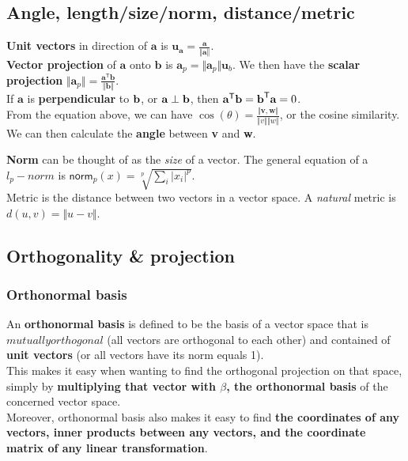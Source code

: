 \documentclass[12pt]{article}
\begin{document}
\subsection*{Angle, length/size/norm, distance/metric}
\textbf{Unit vectors} in direction of $\textbf{a}$ is $\textbf{u}_\textbf{a} = \frac{\textbf{a}}{\Vert \textbf{a}\Vert}$.\\
\textbf{Vector projection} of $\textbf{a}$ onto $\textbf{b}$ is $\textbf{a}_p=\Vert \textbf{a}_p\Vert \textbf{u}_b$. We then have the \textbf{scalar projection} $\Vert \textbf{a}_p\Vert= \frac{\textbf{a}^\textsf{T}\textbf{b}}{\Vert\textbf{b}\Vert}$.\\
If $\textbf{a}$ is \textbf{perpendicular} to $\textbf b$, or $\textbf a \perp\textbf  b$, then $\textbf a^\textsf{T}\textbf b=\textbf  b^\textsf{T}\textbf a = 0$.\\
From the equation above, we can have $\cos(\theta) = \frac{\Vert \textbf{v},\textbf{w} \Vert}{\Vert v \Vert \Vert w\Vert}$, or the cosine similarity. We can then calculate the \textbf{angle} between \textbf{v} and \textbf{w}.

\textbf{Norm} can be thought of as the \textit{size} of a vector. The general equation of a $l_p-norm$ is $\textsf{norm}_p(x) = \sqrt[p]{\sum_i|x_i|^p}$.\\
Metric is the distance between two vectors in a vector space. A \textit{natural} metric is $d(u,v) = \Vert u-v\Vert$.\
\subsection*{Orthogonality \& projection}
\subsubsection*{Orthonormal basis}
An \textbf{orthonormal basis} is defined to be the basis of a vector space that is $mutually orthogonal$ (all vectors are orthogonal to each other) and contained of \textbf{unit vectors} (or all vectors have its norm equals 1).\\
This makes it easy when wanting to find the orthogonal projection on that space, simply by \textbf{multiplying that vector with $\beta$, the orthonormal basis} of the concerned vector space. \\
Moreover, orthonormal basis also makes it easy to find \textbf{ the coordinates of any vectors, inner products between any vectors, and the coordinate matrix of any linear transformation}.
\end{document}
